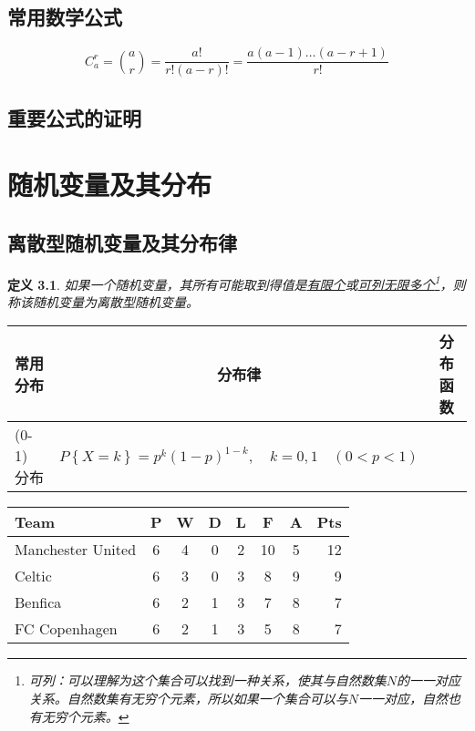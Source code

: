 \documentclass[11pt]{book}
\newtheorem{definition}{\hspace{2em}\textbf{定义}}
\newcounter{#2}
\newcounter{#2}[#1]
\numberwithin{#2}{#1}
\newcommand{\inlinekeywords}[1]{\uline{#1}}
\begin{document}
	\section{常用数学公式}
		\begin{equation}
			C_a ^r =\binom{a}{r}=\frac{a!}{r!(a-r)!}=\frac{a(a-1)\dots (a-r+1)}{r!}
		\end{equation}
	\section{重要公式的证明}
	
	\chapter{随机变量及其分布}
	
	\section{离散型随机变量及其分布律}
		\begin{definition}
			如果一个随机变量，其所有可能取到得值是\inlinekeywords{有限个}或\inlinekeywords{可列无限多个}\footnote{可列：可以理解为这个集合可以找到一种关系，使其与自然数集$ N $的一一对应关系。自然数集有无穷个元素，所以如果一个集合可以与$ N $一一对应，自然也有无穷个元素。}，则称该随机变量为离散型随机变量。
		\end{definition}
		
		
		\begin{tabular}{|l|c|c|}
			\hline
			常用分布 & 分布律 & 分布函数 \\
			\hline
			(0-1) 分布 & $
			P\left\lbrace X=k\right\rbrace =p^k\left( 1-p\right) ^{1-k},\hspace{1em}k=0,1 \hspace{1em}\left( 0<p<1\right) 
			$ & \\
			\hline
		\end{tabular}

	\begin{tabular}{l*{6}{c}r}
		Team              & P & W & D & L & F  & A & Pts \\
		\hline
		Manchester United & 6 & 4 & 0 & 2 & 10 & 5 & 12  \\
		Celtic            & 6 & 3 & 0 & 3 &  8 & 9 &  9  \\
		Benfica           & 6 & 2 & 1 & 3 &  7 & 8 &  7  \\
		FC Copenhagen     & 6 & 2 & 1 & 3 &  5 & 8 &  7  \\
	\end{tabular}
 
\end{document}
